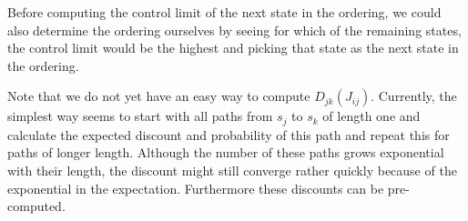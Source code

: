 Before computing the control limit of the next state in the ordering, we could also determine the ordering ourselves by seeing for which of the remaining states, the control limit would be the highest and picking that state as the next state in the ordering.

Note that we do not yet have an easy way to compute $D_{jk}(J_{ij})$.
Currently, the simplest way seems to start with all paths from $s_j$ to $s_k$ of length one and calculate the expected discount and probability of this path and repeat this for paths of longer length.
Although the number of these paths grows exponential with their length, the discount might still converge rather quickly because of the exponential in the expectation.
Furthermore these discounts can be pre-computed.
